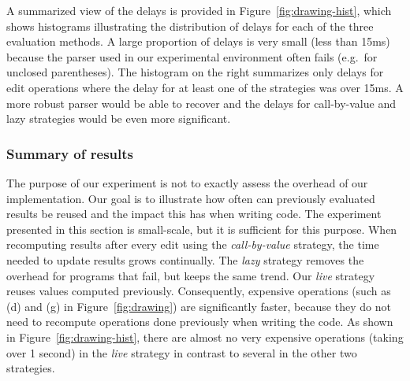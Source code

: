 \documentclass[english,submission]{programming}
\theoremstyle{plain}
\theoremstyle{definition}
\begin{document}
\noindent
A summarized view of the delays is provided in Figure~\ref{fig:drawing-hist}, which shows
histograms illustrating the distribution of delays for each of the three evaluation methods.
A large proportion of delays is very small (less than 15ms) because the parser used in our
experimental environment often fails (e.g.~for unclosed parentheses). The histogram
on the right summarizes only delays for edit operations where the delay for at least one of
the strategies was over 15ms. A more robust parser would be able to recover and the delays
for call-by-value and lazy strategies would be even more significant.

\subsubsection{Summary of results}
The purpose of our experiment is not to exactly assess the overhead of our implementation.
Our goal is to illustrate how often can previously evaluated results be reused and the impact
this has when writing code. The experiment presented in this section is small-scale, but it is
sufficient for this purpose. When recomputing results after every edit
using the \emph{call-by-value} strategy, the time needed to update results grows
continually. The \emph{lazy} strategy removes the overhead for programs that fail, but
keeps the same trend. Our \emph{live} strategy reuses values computed
previously. Consequently, expensive operations (such as (d) and (g) in Figure~\ref{fig:drawing})
are significantly faster, because they do not need to recompute operations done previously when
writing the code. As shown in Figure~\ref{fig:drawing-hist}, there are almost no very expensive
operations (taking over 1 second) in the \emph{live} strategy in contrast to several in the
other two strategies.

\end{document}
